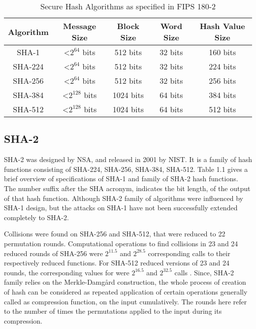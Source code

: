   \begin{table}[h]
    \begin{center}
    \begin{tabular}{ *{5}{c} }
      \hline
      Algorithm & Message Size & Block Size & Word Size & Hash Value Size \\ \hline \hline
      SHA-1   & \textless $2^{64}$  bits & 512  bits & 32 bits & 160 bits \\   
      SHA-224 & \textless $2^{64}$  bits & 512  bits & 32 bits & 224 bits \\   
      SHA-256 & \textless $2^{64}$  bits & 512  bits & 32 bits & 256 bits \\   
      SHA-384 & \textless $2^{128}$ bits & 1024 bits & 64 bits & 384 bits \\   
      SHA-512 & \textless $2^{128}$ bits & 1024 bits & 64 bits & 512 bits \\
      \hline
    \end{tabular}
    \caption{ Secure Hash Algorithms as specified in FIPS 180-2} 
  \end{center}
  \end{table}

  \subsection{SHA-2}

  SHA-2 was designed by NSA, and released in 2001 by NIST. It is a family of hash functions consisting of 
  SHA-224, SHA-256, SHA-384, SHA-512. Table 1.1 gives a brief overview of specifications
  of SHA-1 and family of SHA-2 hash functions. The number suffix after the SHA acronym, 
  indicates the bit length, of the output of that hash function. Although SHA-2 family of algorithms
  were influenced by SHA-1 design, but the attacks on SHA-1 have not been successfully extended completely
  to SHA-2.

  Collisions were found on SHA-256 and SHA-512, that were reduced to 22 permutation rounds. Computational
  operations to find collisions in 23 and 24 reduced rounds of SHA-256 were $2^{11.5}$ and $2^{28.5}$ 
  corresponding calls to their respectively reduced functions. For SHA-512 reduced versions of 23 and 24 rounds, 
  the corresponding values for were $2^{16.5}$ and $2^{32.5}$ calls \cite{00012}.
  Since, SHA-2 family relies on the Merkle-Damg\r{a}rd construction, the whole
  process of creation of hash can be considered as repeated application of certain operations generally called
  as compression function, on the input cumulatively. The rounds here refer to the number of times the permutations
  applied to the input during its compression.

